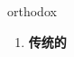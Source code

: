 
\begin{frame}
{\huge orthodox}
\begin{center}
\begin{enumerate}\Large
  \item \textbf{传统的}
\end{enumerate}
\end{center}
\end{frame}
